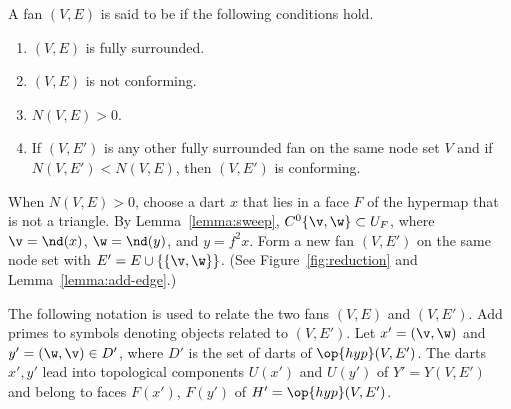 \begin{definition}
A fan $(V,E)$ is said to be  if
the following conditions hold.
\begin{enumerate}\wasitemize 
\item $(V,E)$ is fully surrounded.
\item $(V,E)$ is not conforming.
\item $N(V,E)>0$.
\item If $(V,E')$ is any other fully surrounded fan on the same node
set $V$ and if $N(V,E') < N(V,E)$, then $(V,E')$ is conforming.
\end{enumerate}\wasitemize 
\end{definition}
%



\begin{remark}\label{remark:reduction}
  When $N(V,E)>0$, choose a dart $x$ that lies in a face $F$ of the
  hypermap that is not a triangle.  By Lemma~\ref{lemma:sweep},
  $C^0\{\v,\w\}\subset U_F$, where $\v=\nd(x)$, $\w=\nd(y)$, and
  $y=f^2 x$.  Form a new fan $(V,E')$ on the same node set with $E' =
  E\cup \{\{\v,\w\}\}$.  (See Figure~\ref{fig:reduction} and Lemma~\ref{lemma:add-edge}.)

\figRNMBPJD %

The following notation is used to relate the two fans $(V,E)$ and $(V,E')$.  
Add primes to symbols
denoting objects related to $(V,E')$.
Let $x'=(\v,\w)$ and $y'=(\w,\v)\in D'$, where $D'$ is the set of darts of $\op{hyp}(V,E')$.
The darts $x',y'$ lead into topological components
$U(x')$ and $U(y')$ of $Y'=Y(V,E')$ and belong to faces $F(x')$,
$F(y')$ of $H'=\op{hyp}(V,E')$.
\end{remark}

